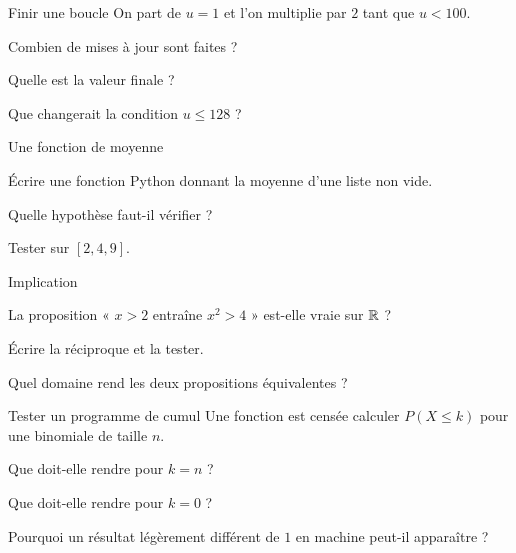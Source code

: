 \begingroup\renewcommand{\otBesoinPlace}[1]{}\begin{minipage}{\linewidth}
\begin{exercice}[2]{Finir une boucle}
On part de $u=1$ et l’on multiplie par $2$ tant que $u<100$.
\begin{questions}
\item Combien de mises à jour sont faites ?
\item Quelle est la valeur finale ?
\item Que changerait la condition $u\leq128$ ?
\end{questions}
\end{exercice}
\begin{exercice}[2]{Une fonction de moyenne}

\begin{questions}
\item Écrire une fonction Python donnant la moyenne d’une liste non vide.
\item Quelle hypothèse faut-il vérifier ?
\item Tester sur $[2,4,9]$.
\end{questions}
\end{exercice}
\begin{exercice}[2]{Implication}

\begin{questions}
\item La proposition « $x>2$ entraîne $x^2>4$ » est-elle vraie sur $\mathbb{R}$ ?
\item Écrire la réciproque et la tester.
\item Quel domaine rend les deux propositions équivalentes ?
\end{questions}
\end{exercice}
\begin{exercice}[2]{Tester un programme de cumul}
Une fonction est censée calculer $P(X\leq k)$ pour une binomiale de taille $n$.
\begin{questions}
\item Que doit-elle rendre pour $k=n$ ?
\item Que doit-elle rendre pour $k=0$ ?
\item Pourquoi un résultat légèrement différent de $1$ en machine peut-il apparaître ?
\end{questions}
\end{exercice}
\end{minipage}\endgroup
\clearpage
{}
